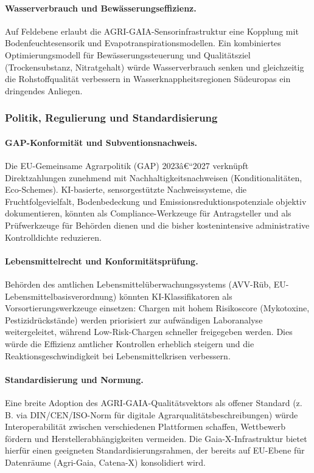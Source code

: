 \documentclass[a4paper, 12pt, twoside, openright]{report}
\theoremstyle{definition}
\theoremstyle{definition}
\begin{document}
\paragraph{Wasserverbrauch und Bewässerungseffizienz.}
Auf Feldebene erlaubt die AGRI-GAIA-Sensorinfrastruktur eine Kopplung
mit Bodenfeuchtesensorik und Evapotranspira\-tions\-modellen. Ein
kombiniertes Optimierungsmodell für Bewässerungssteuerung und
Qualitätsziel (Trockensubstanz, Nitratgehalt) würde Wasserverbrauch
senken und gleichzeitig die Rohstoffqualität verbessern in
Wasserknappheitsregionen Südeuropas ein dringendes Anliegen.

\subsubsection{Politik, Regulierung und Standardisierung}

\paragraph{GAP-Konformität und Subventionsnachweis.}
Die EU-Gemeinsame Agrarpolitik (GAP) 2023â€“2027 verknüpft Direktzahlungen
zunehmend mit Nachhaltigkeitsnachweisen (Konditionali\-täten, Eco-Schemes).
KI-basierte, sensorgestützte Nachweissysteme, die Fruchtfolgevielfalt,
Bodenbedeckung und Emissionsreduktionspotenziale objektiv dokumentieren,
könnten als Compliance-Werkzeuge für Antragsteller und als
Prüfwerkzeuge für Behörden dienen und die bisher kostenintensive
administrative Kontrolldichte reduzieren.

\paragraph{Lebensmittelrecht und Konformitätsprüfung.}
Behörden des amtlichen Lebensmittelüberwachungssystems (AVV-Rüb,
EU-Lebensmittelbasisverordnung) könnten KI-Klassifikatoren als
Vorsortierungswerkzeuge einsetzen: Chargen mit hohem Risikoscore
(Mykotoxine, Pestizidrückstände) werden priorisiert zur aufwändigen
Laboranalyse weitergeleitet, während Low-Risk-Chargen schneller
freigegeben werden. Dies würde die Effizienz amtlicher Kontrollen
erheblich steigern und die Reaktionsgeschwindigkeit bei
Lebensmittelkrisen verbessern.

\paragraph{Standardisierung und Normung.}
Eine breite Adoption des AGRI-GAIA-Qualitätsvek\-tors als offener
Standard (z.\,B. via DIN/CEN/ISO-Norm für digitale Agrarqualitäts\-beschreibungen)
würde Interoperabilität zwischen verschiedenen Plattformen schaffen,
Wettbewerb fördern und Hersteller\-abhängigkeiten vermeiden.
Die Gaia-X-Infrastruktur bietet hierfür einen geeigneten
Standardisierungsrahmen, der bereits auf EU-Ebene für
Datenräume (Agri-Gaia, Catena-X) konsolidiert wird.
\end{document}
